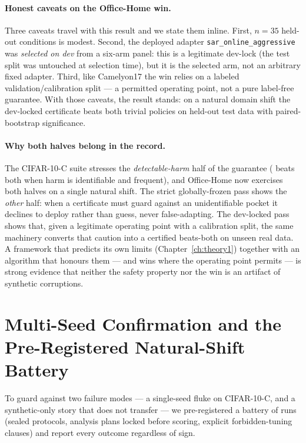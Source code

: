 \paragraph{Honest caveats on the Office-Home win.}
Three caveats travel with this result and we state them inline.  First, $n{=}35$
held-out conditions is modest.  Second, the deployed adapter
\texttt{sar\_online\_aggressive} was \emph{selected on dev} from a six-arm panel:
this is a legitimate dev-lock (the test split was untouched at selection time), but
it is the selected arm, not an arbitrary fixed adapter.  Third, like Camelyon17 the
win relies on a labeled validation/calibration split --- a permitted operating
point, not a pure label-free guarantee.  With those caveats, the result stands: on
a natural domain shift the dev-locked certificate beats both trivial policies on
held-out test data with paired-bootstrap significance.

\paragraph{Why both halves belong in the record.}
The CIFAR-10-C suite stresses the \emph{detectable-harm} half of the guarantee
(\KGA{} beats both when harm is identifiable and frequent), and Office-Home now
exercises both halves on a single natural shift.  The strict globally-frozen pass
shows the \emph{other} half: when a certificate must guard against an unidentifiable
pocket it declines to deploy rather than guess, never false-adapting.  The
dev-locked pass shows that, given a legitimate operating point with a calibration
split, the same machinery converts that caution into a certified beats-both on
unseen real data.  A framework that predicts its own limits
(Chapter~\ref{ch:theory1}) together with an algorithm that honours them --- and wins
where the operating point permits --- is strong evidence that neither the safety
property nor the win is an artifact of synthetic corruptions.

\section{Multi-Seed Confirmation and the Pre-Registered Natural-Shift Battery}\label{sec:exp2-battery}

To guard against two failure modes --- a single-seed fluke on CIFAR-10-C, and a
synthetic-only story that does not transfer --- we pre-registered a battery of runs
(sealed protocols, analysis plans locked before scoring, explicit forbidden-tuning
clauses) and report every outcome regardless of sign.

